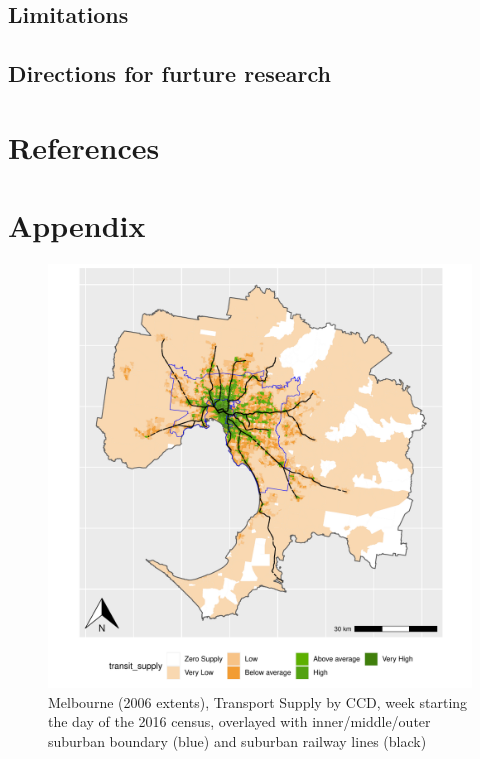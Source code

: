 \documentclass[preprint, 3p,
authoryear]{elsarticle} %
\begin{document}
\subsection{Limitations}\label{limitations}

\subsection{Directions for furture
research}\label{directions-for-furture-research}

\section*{References}\label{references}

\section{Appendix}\label{appendix}

\begin{figure}
\centering
\includegraphics{ReynoldsCurrieQu2024_files/figure-latex/Greater_Melbourne_CCD_2016_appendix-1.pdf}
\caption{Melbourne (2006 extents), Transport Supply by CCD, week
starting the day of the 2016 census, overlayed with inner/middle/outer
suburban boundary (blue) and suburban railway lines (black)}
\end{figure}
\end{document}
